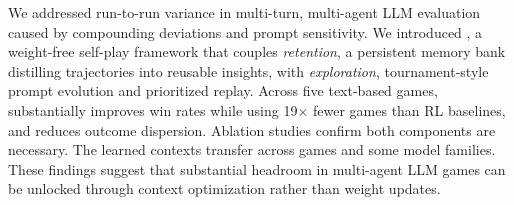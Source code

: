 We addressed run-to-run variance in multi-turn, multi-agent LLM evaluation caused by compounding deviations and prompt sensitivity. We introduced \NAME{}, a weight-free self-play framework that couples \emph{retention}, a persistent memory bank distilling trajectories into reusable insights, with \emph{exploration}, tournament-style prompt evolution and prioritized replay. Across five text-based games, \NAME{} substantially improves win rates while using 19$\times$ fewer games than RL baselines, and reduces outcome dispersion. Ablation studies confirm both components are necessary. The learned contexts transfer across games and some model families. These findings suggest that substantial headroom in multi-agent LLM games can be unlocked through context optimization rather than weight updates.
